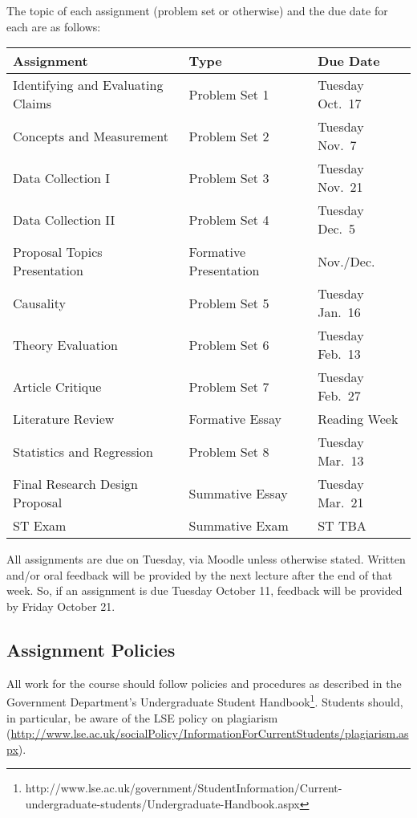 \documentclass[12pt,a4paper]{article}
\begin{document}
The topic of each assignment (problem set or otherwise) and the due date for each are as follows:

\begin{center}
\begin{tabular}{lll} \toprule
\textbf{Assignment} & \textbf{Type} & \textbf{Due Date} \\ \midrule
Identifying and Evaluating Claims & Problem Set 1 & Tuesday Oct.~17 \\
Concepts and Measurement & Problem Set 2 & Tuesday Nov.~7 \\
Data Collection I & Problem Set 3 & Tuesday Nov.~21 \\
Data Collection II & Problem Set 4 & Tuesday Dec.~5 \\
Proposal Topics Presentation & Formative Presentation & Nov./Dec. \\  \midrule 
Causality & Problem Set 5 & Tuesday Jan.~16 \\
Theory Evaluation & Problem Set 6 & Tuesday Feb.~13 \\
Article Critique & Problem Set 7 & Tuesday Feb.~27 \\
Literature Review & Formative Essay & Reading Week \\ 
Statistics and Regression & Problem Set 8 & Tuesday Mar.~13 \\ \midrule 
Final Research Design Proposal & Summative Essay & Tuesday Mar.~21 \\ \midrule 
ST Exam & Summative Exam & ST TBA \\
\bottomrule
\end{tabular}
\end{center}

All assignments are due on Tuesday, via Moodle unless otherwise stated. Written and/or oral feedback will be provided by the next lecture after the end of that week. So, if an assignment is due Tuesday October 11, feedback will be provided by Friday October 21.

\subsection{Assignment Policies}

All work for the course should follow policies and procedures as described in the Government Department's Undergraduate Student Handbook\footnote{http://www.lse.ac.uk/government/StudentInformation/Current-undergraduate-students/Undergraduate-Handbook.aspx}. Students should, in particular, be aware of the LSE policy on plagiarism (\url{http://www.lse.ac.uk/socialPolicy/InformationForCurrentStudents/plagiarism.aspx}).
\end{document}
